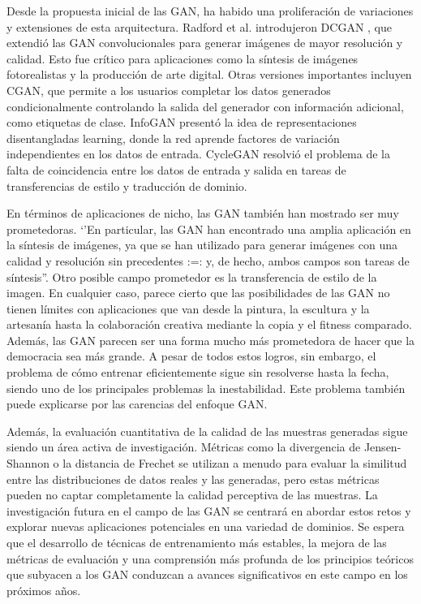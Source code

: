 Desde la propuesta inicial de las GAN, ha habido una proliferación de variaciones y extensiones de esta arquitectura. Radford et al. introdujeron DCGAN , que extendió las GAN convolucionales para generar imágenes de mayor resolución y calidad. Esto fue crítico para aplicaciones como la síntesis de imágenes fotorealistas y la producción de arte digital. Otras versiones importantes incluyen CGAN, que permite a los usuarios completar los datos generados condicionalmente controlando la salida del generador con información adicional, como etiquetas de clase. InfoGAN presentó la idea de representaciones disentangladas learning, donde la red aprende factores de variación independientes en los datos de entrada. CycleGAN resolvió el problema de la falta de coincidencia entre los datos de entrada y salida en tareas de transferencias de estilo y traducción de dominio.

En términos de aplicaciones de nicho, las GAN también han mostrado ser muy prometedoras. ‘’En particular, las GAN han encontrado una amplia aplicación en la síntesis de imágenes, ya que se han utilizado para generar imágenes con una calidad y resolución sin precedentes :=: y, de hecho, ambos campos son tareas de síntesis”. Otro posible campo prometedor es la transferencia de estilo de la imagen. En cualquier caso, parece cierto que las posibilidades de las GAN no tienen límites con aplicaciones que van desde la pintura, la escultura y la artesanía hasta la colaboración creativa mediante la copia y el fitness comparado. Además, las GAN parecen ser una forma mucho más prometedora de hacer que la democracia sea más grande. A pesar de todos estos logros, sin embargo, el problema de cómo entrenar eficientemente sigue sin resolverse hasta la fecha, siendo uno de los principales problemas la inestabilidad. Este problema también puede explicarse por las carencias del enfoque GAN.

Además, la evaluación cuantitativa de la calidad de las muestras generadas sigue siendo un área activa de investigación. Métricas como la divergencia de Jensen-Shannon o la distancia de Frechet se utilizan a menudo para evaluar la similitud entre las distribuciones de datos reales y las generadas, pero estas métricas pueden no captar completamente la calidad perceptiva de las muestras. La investigación futura en el campo de las GAN se centrará en abordar estos retos y explorar nuevas aplicaciones potenciales en una variedad de dominios. Se espera que el desarrollo de técnicas de entrenamiento más estables, la mejora de las métricas de evaluación y una comprensión más profunda de los principios teóricos que subyacen a los GAN conduzcan a avances significativos en este campo en los próximos años.

